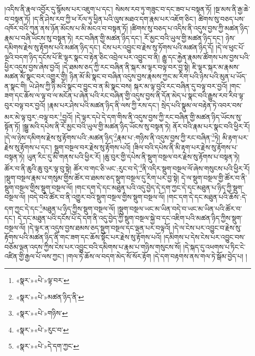 །འདིས་ནི་རྣལ་འབྱོར་དུ་སྙོམས་པར་འཇུག་པ་དང་། སེམས་རབ་ཏུ་གཟུང་བ་དང་ཟབ་པ་བསྟན་ཏོ། །སྔ་མས་ནི་རྒྱ་ཆེ་བ་བསྟན་ཏོ། །ད་ནི་ཤེས་རབ་ཀྱི་ཕ་རོལ་ཏུ་ཕྱིན་པའི་ལུས་མཐའ་དག་རྣམ་པར་འཇོག་ཅིང་། ཚིགས་སུ་བཅད་པས་འཁོར་བའི་ཀུན་ནས་ཉོན་མོངས་པ་མི་མངའ་བ་བསྟན་ཏོ། །ཚིགས་སུ་བཅད་པ་འདིས་ནི་འདུས་བྱས་ཀྱི་མཚན་ཉིད་རྣམ་པ་བཞི་ཡོངས་སུ་བསྟན་ཏེ། རང་བཞིན་གྱི་མཚན་ཉིད་དང་། རོ་མྱང་བའི་ཡུལ་གྱི་མཚན་ཉིད་དང་། ཉེས་དམིགས་རྗེས་སུ་རྟོགས་པའི་མཚན་ཉིད་དང་། ངེས་པར་འབྱུང་བ་རྗེས་སུ་ཏོགས་པའི་མཚན་ཉིད་དོ། །དེ་ལ་ཕུང་པོ་ལྔའི་བདག་ཉིད་དངོས་པོ་ཇི་ལྟར་སྣང་བ་རྟེན་ཅིང་འབྲེལ་པར་འབྱུང་བ་ནི། རྒྱུ་དང་རྐྱེན་རྣམས་ཚོགས་པས་བྱས་པའི་ཕྱིར་འདུས་བྱས་ཞེས་བྱའོ། །དེ་ཐམས་ཅད་ཀྱི་རང་བཞིན་ནི་སྐར་མ་ལྟར་བལྟ་བར་བྱ་སྟེ། ཇི་ལྟར་སྐར་མ་རྣམས་མཚན་མོ་སྣང་བར་འགྱུར་གྱི། ཉིན་མོ་མི་སྣང་བ་བཞིན་འདུས་བྱས་རྣམས་ཀྱང་མ་རིག་པའི་ཉེས་པའི་མུན་པ་ཡོད་ན་སྣང་གི། ཡེ་ཤེས་ཀྱི་ཉི་མའི་སྣང་བ་བྱུང་བ་ན་མི་སྣང་བས། སྐར་མ་ལྟ་བུའི་རང་བཞིན་དུ་བལྟ་བར་བྱའོ། །གང་ཟག་དང་ཆོས་ལ་ལྟ་བ་ལ་མངོན་པ་ཞེན་པའི་རང་བཞིན་གྱི་འདུས་བྱས་ནི་དོན་མེད་པ་སྣང་བའི་རྒྱུས་རབ་རིབ་ལྟ་བུར་བལྟ་བར་བྱའོ། །རྣམ་པར་ཤེས་པའི་མཚན་ཉིད་ནི་ལས་ཀྱི་རས་དང་། སྲེད་པའི་སྣུམ་ལ་བརྟེན་ཏེ་འབར་བས་མར་མེ་ལྟ་བུར་:བལྟ་བར་\footnote{«སྣར་»«པེ་»ལྟ་བར་}བྱའོ། །དེ་ལྟར་དཔེ་དེ་དག་གིས་ནི་འདུས་བྱས་ཀྱི་རང་བཞིན་གྱི་མཚན་ཉིད་ཡོངས་སུ་སྟོན་ཏོ། །སྒྱུ་མའི་དཔེས་ནི་རོ་མྱང་བའི་ཡུལ་གྱི་མཚན་ཉིད་ཡོངས་སུ་བསྟན་ཏེ། ནོར་བའི་རྣམ་པར་སྣང་བའི་ཕྱིར་རོ། །དེ་ལ་ཉེས་དམིགས་རྗེས་སུ་རྟོགས་པའི་:མཚན་ཉིད་\footnote{«སྣར་»«པེ་»མཚན་ཉིད་ནི་}རྣམ་པ་:གཉིས་ནི་འདུས་བྱས་ཀྱི་རང་བཞིན་\footnote{«སྣར་»«པེ་»གཉིས་}ཏེ། མི་རྟག་པར་རྗེས་སུ་རྟོགས་པ་དང་། སྡུག་བསྔལ་བར་རྗེས་སུ་རྟོགས་པའོ། །ཟིལ་བའི་དཔེས་ནི་མི་རྟག་པར་རྗེས་སུ་རྟོགས་པ་བསྟན་ཏེ། ཡུན་རིང་དུ་མི་གནས་པའི་ཕྱིར་རོ། །ཆུ་བུར་གྱི་དཔེས་ནི་སྡུག་བསྔལ་བར་རྗེས་སུ་རྟོགས་པ་བསྟན་ཏེ། ཚོར་བ་ནི་ཆུའི་ཆུ་བུར་ལྟ་བུ་སྟེ། ཚོར་བ་གང་ཅི་ཡང་:རུང་བ་དེ་\footnote{«སྣར་»«པེ་»རུང་བ་}ནི་འདིར་སྡུག་བསྔལ་ལོ་ཞེས་གསུངས་པའི་ཕྱིར་རོ། །སྡུག་བསྔལ་རྣམ་པ་གསུམ་གྱིས་ཚོར་བ་ཐམས་ཅད་སྡུག་བསྔལ་དུ་རིག་པར་བྱ་སྟེ། དེ་ལ་སྡུག་བསྔལ་གྱི་ཚོར་བ་ནི་སྡུག་བསྔལ་གྱིས་སྡུག་བསྔལ་ལོ། །གང་དག་དེ་དང་མཐུན་པའི་འདུ་བྱེད་དེ་དག་ཀྱང་དེ་དང་མཐུན་པ་ཉིད་ཀྱི་སྡུག་བསྔལ་ལོ། །བདེ་བའི་ཚོར་བ་ནི་འགྱུར་བའི་སྡུག་བསྔལ་གྱིས་སྡུག་བསྔལ་ལོ། །གང་དག་དེ་དང་མཐུན་པའི་ཆོས་:དེ་དག་ཀྱང་དེ་དང་\footnote{«སྣར་»«པེ་»དེ་དག་ཀྱང་}མཐུན་པ་ཉིད་ཀྱིས་སྡུག་བསྔལ་ལོ། །སྡུག་བསྔལ་ཡང་མ་ཡིན་བདེ་བ་ཡང་མ་ཡིན་པའི་ཚོར་བ་དང་། དེ་དང་མཐུན་པའི་དངོས་པོ་དེ་དག་ནི་འདུ་བྱེད་ཀྱི་སྡུག་བསྔལ་སྐྱེ་བ་དང་འཇིག་པའི་མཚན་ཉིད་ཀྱིས་སྡུག་བསྔལ་ལོ། །དེ་ལྟར་ན་འདུས་བྱས་ཐམས་ཅད་སྡུག་བསྔལ་དང་ལྡན་པར་བལྟའོ། །དེ་ལ་ངེས་པར་འབྱུང་བ་རྗེས་སུ་རྟོགས་པའི་མཚན་ཉིད་ནི་གང་ཟག་དང་ཆོས་སྟོང་པར་རྗེས་སུ་རྟོགས་པའོ། །དམིགས་པ་དེས་ངེས་པར་འབྱུང་བས་བཅོམ་ལྡན་འདས་ཀྱིས་ངེས་པར་འབྱུང་བའི་དམིགས་པ་རྣམ་པ་གཉིས་གསུངས་སོ། །དེ་སྐད་དུ་འཕགས་པ་ཏིང་ངེ་འཛིན་གྱི་རྒྱལ་པོ་ལས་ཀྱང་། །གལ་ཏེ་ཆོས་ལ་བདག་མེད་སོ་སོར་རྟོག །དེ་དག་བརྟགས་ནས་གལ་ཏེ་སྒོམ་བྱེད་པ། །
